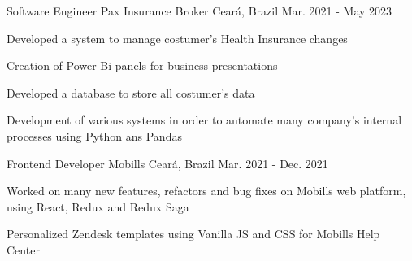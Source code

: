 \begin{cventries}
  \cventry
    {Software Engineer} %
    {Pax Insurance Broker} %
    {Ceará, Brazil} %
    {Mar. 2021 - May 2023} %
    {
      \begin{cvitems} %
        \item {Developed a system to manage costumer's Health Insurance changes}
        \item {Creation of Power Bi panels for business presentations}
        \item {Developed a database to store
        all costumer's data}
        \item {Development of various systems in order to automate many company's internal processes using Python ans Pandas}
      \end{cvitems}
    }

  \cventry
    {Frontend Developer} %
    {Mobills} %
    {Ceará, Brazil} %
    {Mar. 2021 - Dec. 2021} %
    {
      \begin{cvitems} %
        \item {Worked on many new features,
        refactors and bug fixes on Mobills
        web platform, using React, Redux
        and Redux Saga}
        \item {Personalized Zendesk templates
        using Vanilla JS and CSS for
        Mobills Help Center}
      \end{cvitems}
    }

\end{cventries}
